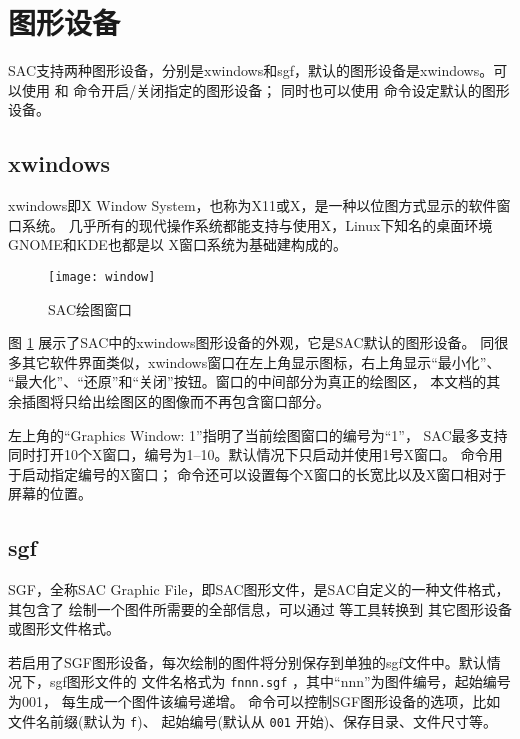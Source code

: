 \section{图形设备}
SAC支持两种图形设备，分别是xwindows和sgf，默认的图形设备是xwindows。可以使用
 和  命令开启/关闭指定的图形设备；
同时也可以使用  命令设定默认的图形设备。

\subsection{xwindows}
xwindows即X Window System，也称为X11或X，是一种以位图方式显示的软件窗口系统。
几乎所有的现代操作系统都能支持与使用X，Linux下知名的桌面环境GNOME和KDE也都是以
X窗口系统为基础建构成的。

\begin{figure}[H]
\centering
\texttt{[image: window]}
\caption{SAC绘图窗口}
\label{fig:plot}
\end{figure}

图 \ref{fig:plot} 展示了SAC中的xwindows图形设备的外观，它是SAC默认的图形设备。
同很多其它软件界面类似，xwindows窗口在左上角显示图标，右上角显示``最小化''、
``最大化''、``还原''和``关闭''按钮。窗口的中间部分为真正的绘图区，
本文档的其余插图将只给出绘图区的图像而不再包含窗口部分。

左上角的``Graphics Window: 1''指明了当前绘图窗口的编号为``1''，
SAC最多支持同时打开10个X窗口，编号为1--10。默认情况下只启动并使用1号X窗口。
 命令用于启动指定编号的X窗口；
 命令还可以设置每个X窗口的长宽比以及X窗口相对于屏幕的位置。

\subsection{sgf}
SGF，全称SAC Graphic File，即SAC图形文件，是SAC自定义的一种文件格式，其包含了
绘制一个图件所需要的全部信息，可以通过  等工具转换到
其它图形设备或图形文件格式。

若启用了SGF图形设备，每次绘制的图件将分别保存到单独的sgf文件中。默认情况下，sgf图形文件的
文件名格式为 \texttt{fnnn.sgf} ，其中``nnn''为图件编号，起始编号为001，
每生成一个图件该编号递增。
 命令可以控制SGF图形设备的选项，比如文件名前缀(默认为 \texttt{f})、
起始编号(默认从 \texttt{001} 开始)、保存目录、文件尺寸等。
